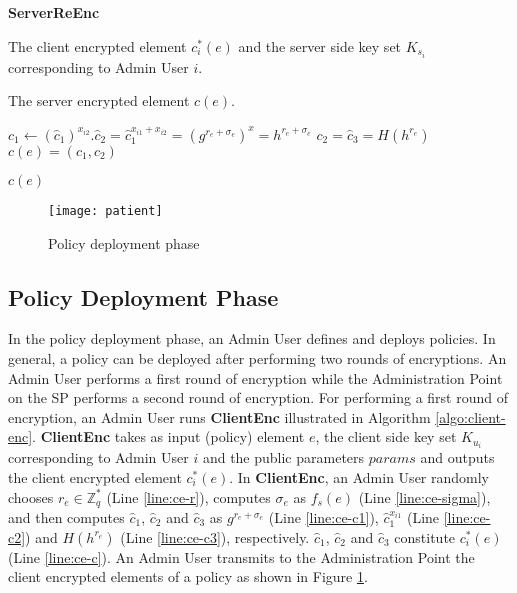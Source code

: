 \documentclass[final,5p,times,twocolumn]{elsarticle}
\newcommand{\algofontsize}{\fontsize{7}{8}\selectfont}
\begin{document}
\begin{algorithm}[htp]
{\algofontsize
\caption{\textbf{ServerReEnc}}

\label{algo:server-re-enc}

\begin{algorithmic}[1]

\REQUIRE The client encrypted element $c^*_i (e)$ and the server side key set $K_{s_i}$ corresponding to Admin User $i$.

\ENSURE The server encrypted element $c(e)$.

\medskip

\STATE $c_1 \leftarrow (\hat{c}_1)^{x_{i2}}.\hat{c}_2 = \hat{c}_1^{x_{i1}+x_{i2}} = (g^{r_e+{\sigma}_e})^x = h^{r_e+{\sigma}_e}$ \label{line:se-c1}
\STATE $c_2 = \hat{c}_3 = H(h^{r_e})$ \label{line:se-c2}
\STATE $c(e) = (c_1, c_2)$ \label{line:se-c}

\RETURN $c(e)$

\end{algorithmic}
}
\end{algorithm}



\begin{figure}
\centering
\texttt{[image: patient]} \caption{Policy deployment phase}
\label{fig:patient}
\end{figure}

\subsection{Policy Deployment Phase}
In the policy deployment phase, an Admin User defines and deploys policies. In general, a policy can be deployed after performing two rounds of encryptions. An Admin User performs a first round of encryption while the Administration Point on the SP performs a second round of encryption. For performing a first round of encryption, an Admin User runs \textbf{ClientEnc} illustrated in Algorithm \ref{algo:client-enc}. \textbf{ClientEnc} takes as input (policy) element $e$, the client side key set $K_{u_i}$ corresponding to Admin User $i$ and the public parameters $params$ and outputs the client encrypted element $c^*_i (e)$. In \textbf{ClientEnc}, an Admin User randomly chooses $r_{e} \in \mathbb{Z}^*_q$ (Line \ref{line:ce-r}), computes ${\sigma}_e$ as $f_s (e)$ (Line \ref{line:ce-sigma}), and then computes $\hat{c}_1$, $\hat{c}_2$ and $\hat{c}_3$ as $g^{r_e+{\sigma}_e}$ (Line \ref{line:ce-c1}), $\hat{c}_1^{x_{i1}}$ (Line \ref{line:ce-c2}) and $H(h^{r_e})$ (Line \ref{line:ce-c3}), respectively. $\hat{c}_1$, $\hat{c}_2$ and $\hat{c}_3$ constitute $c^*_i (e)$ (Line \ref{line:ce-c}). An Admin User transmits to the Administration Point the client encrypted elements of a policy as shown in Figure \ref{fig:patient}.
\end{document}
